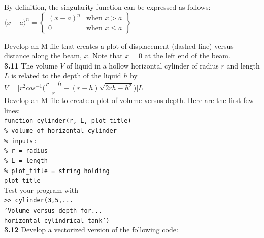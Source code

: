 \documentclass[../main.tex]{subfiles}
\begin{document}
\begin{multicols}{2}
    \noindent By definition, the singularity function can be expressed as
    follows:\\

    $\langle x-a\rangle^{n}=\left\{\begin{array}{cc}
        (x-a)^{n} & \text{when } x>a \\
        0 & \text {when } x\leq a
        \end{array}\right\}$

    \noindent Develop an M-file that creates a plot of displacement
    (dashed line) versus distance along the beam, $x$. Note that
    $x = 0$ at the left end of the beam.\\

    \noindent\textbf{3.11} The volume $V$ of liquid in a hollow horizontal cylinder of
    radius $r$ and length $L$ is related to the depth of the liquid $h$ by\\

    $V = \Big[r^2cos^{-1}\Big(\dfrac{r-h}{r}-(r-h)\sqrt{2rh-h^2} \Big) \Big]L$\\

    \noindent Develop an M-file to create a plot of volume versus depth.
    Here are the first few lines:\\
    

   \texttt{\noindent function cylinder(r, L, plot\_title)\\
    \indent\% volume of horizontal cylinder\\
    \indent\% inputs:\\
    \indent\% r = radius\\
    \indent\% L = length\\
    \indent\% plot\_title = string holding\\
    \indent\hspace{40mm}plot title}\\

    \noindent Test your program with\\

    \texttt{\noindent>> cylinder(3,5,...\\
    \indent'Volume versus depth for...\\
    \indent horizontal cylindrical tank')}\\
    
    \noindent\textbf{3.12} Develop a vectorized version of the following code:\\


\end{multicols}
\end{document}
